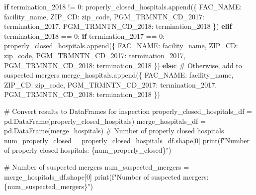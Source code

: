 \documentclass[
  letterpaper,
  DIV=11,
  numbers=noendperiod]{scrartcl}
\newenvironment{Shaded}{\begin{snugshade}}{\end{snugshade}}
\newcommand{\BuiltInTok}[1]{\textcolor[rgb]{0.00,0.23,0.31}{#1}}
\newcommand{\CommentTok}[1]{\textcolor[rgb]{0.37,0.37,0.37}{#1}}
\newcommand{\ControlFlowTok}[1]{\textcolor[rgb]{0.00,0.23,0.31}{\textbf{#1}}}
\newcommand{\DecValTok}[1]{\textcolor[rgb]{0.68,0.00,0.00}{#1}}
\newcommand{\NormalTok}[1]{\textcolor[rgb]{0.00,0.23,0.31}{#1}}
\newcommand{\OperatorTok}[1]{\textcolor[rgb]{0.37,0.37,0.37}{#1}}
\newcommand{\SpecialCharTok}[1]{\textcolor[rgb]{0.37,0.37,0.37}{#1}}
\newcommand{\SpecialStringTok}[1]{\textcolor[rgb]{0.13,0.47,0.30}{#1}}
\newcommand{\StringTok}[1]{\textcolor[rgb]{0.13,0.47,0.30}{#1}}
\begin{document}
\begin{Shaded}
\begin{Highlighting}[]
    \ControlFlowTok{if}\NormalTok{ termination\_2018 }\OperatorTok{!=} \StringTok{\textquotesingle{}0\textquotesingle{}}\NormalTok{:}
\NormalTok{        properly\_closed\_hospitals.append(\{}
            \StringTok{\textquotesingle{}FAC\_NAME\textquotesingle{}}\NormalTok{: facility\_name,}
            \StringTok{\textquotesingle{}ZIP\_CD\textquotesingle{}}\NormalTok{: zip\_code,}
            \StringTok{\textquotesingle{}PGM\_TRMNTN\_CD\_2017\textquotesingle{}}\NormalTok{: termination\_2017,}
            \StringTok{\textquotesingle{}PGM\_TRMNTN\_CD\_2018\textquotesingle{}}\NormalTok{: termination\_2018}
\NormalTok{        \})}
    \ControlFlowTok{elif}\NormalTok{ termination\_2018 }\OperatorTok{==} \StringTok{\textquotesingle{}0\textquotesingle{}}\NormalTok{:}
        \ControlFlowTok{if}\NormalTok{ termination\_2017 }\OperatorTok{==} \StringTok{\textquotesingle{}0\textquotesingle{}}\NormalTok{:}
\NormalTok{            properly\_closed\_hospitals.append(\{}
                \StringTok{\textquotesingle{}FAC\_NAME\textquotesingle{}}\NormalTok{: facility\_name,}
                \StringTok{\textquotesingle{}ZIP\_CD\textquotesingle{}}\NormalTok{: zip\_code,}
                \StringTok{\textquotesingle{}PGM\_TRMNTN\_CD\_2017\textquotesingle{}}\NormalTok{: termination\_2017,}
                \StringTok{\textquotesingle{}PGM\_TRMNTN\_CD\_2018\textquotesingle{}}\NormalTok{: termination\_2018}
\NormalTok{            \})}
        \ControlFlowTok{else}\NormalTok{:}
            \CommentTok{\# Otherwise, add to suspected mergers}
\NormalTok{            merge\_hospitals.append(\{}
                \StringTok{\textquotesingle{}FAC\_NAME\textquotesingle{}}\NormalTok{: facility\_name,}
                \StringTok{\textquotesingle{}ZIP\_CD\textquotesingle{}}\NormalTok{: zip\_code,}
                \StringTok{\textquotesingle{}PGM\_TRMNTN\_CD\_2017\textquotesingle{}}\NormalTok{: termination\_2017,}
                \StringTok{\textquotesingle{}PGM\_TRMNTN\_CD\_2018\textquotesingle{}}\NormalTok{: termination\_2018}
\NormalTok{            \})}

\CommentTok{\# Convert results to DataFrames for inspection}
\NormalTok{properly\_closed\_hospitals\_df }\OperatorTok{=}\NormalTok{ pd.DataFrame(properly\_closed\_hospitals)}
\NormalTok{merge\_hospitals\_df }\OperatorTok{=}\NormalTok{ pd.DataFrame(merge\_hospitals)}
\CommentTok{\# Number of properly closed hospitals}
\NormalTok{num\_properly\_closed }\OperatorTok{=}\NormalTok{ properly\_closed\_hospitals\_df.shape[}\DecValTok{0}\NormalTok{]}
\BuiltInTok{print}\NormalTok{(}\SpecialStringTok{f"Number of properly closed hospitals: }\SpecialCharTok{\{}\NormalTok{num\_properly\_closed}\SpecialCharTok{\}}\SpecialStringTok{"}\NormalTok{)}

\CommentTok{\# Number of suspected mergers}
\NormalTok{num\_suspected\_mergers }\OperatorTok{=}\NormalTok{ merge\_hospitals\_df.shape[}\DecValTok{0}\NormalTok{]}
\BuiltInTok{print}\NormalTok{(}\SpecialStringTok{f"Number of suspected mergers: }\SpecialCharTok{\{}\NormalTok{num\_suspected\_mergers}\SpecialCharTok{\}}\SpecialStringTok{"}\NormalTok{)}
\end{Highlighting}
\end{Shaded}
\end{document}
